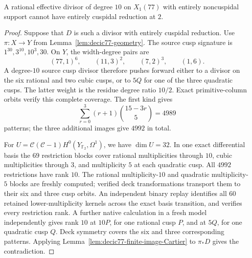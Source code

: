 \begin{lemma}\label{lem:decic77-pure-cusps}
A rational effective divisor of degree $10$ on $X_1(77)$ with
entirely noncuspidal support cannot have entirely cuspidal
reduction at $2$.
\end{lemma}
\begin{proof}
Suppose that $D$ is such a divisor with entirely cuspidal reduction.
Use $\pi:X\to Y$ from Lemma~\ref{lem:decic77-geometry}.
The source cusp signature is $1^{30},3^{10},10^3,30$.
On $Y$, the width-degree pairs are
\[
 (77,1)^6,\qquad(11,3)^2,\qquad(7,2)^3,\qquad(1,6).
\]
A degree-$10$ source cusp divisor therefore pushes forward
either to a divisor on the six rational and two cubic cusps,
or to $5Q$ for one of the three quadratic cusps.
The latter weight is the residue degree ratio $10/2$.
Exact primitive-column orbits verify this complete coverage.
The first kind gives
\[
 \sum_{r=0}^3(r+1)\binom{15-3r}{5}=4989
\]
patterns; the three additional images give $4992$ in total.

For $U=\mathcal C(\mathcal C-1)H^0(Y_{\mathbb F_2},\Omega^1)$,
we have $\dim U=32$.
In one exact differential basis the $69$ restriction blocks
cover rational multiplicities through $10$, cubic multiplicities
through $3$, and multiplicity $5$ at each quadratic cusp.
All $4992$ restrictions have rank $10$.
The rational multiplicity-$10$ and quadratic multiplicity-$5$
blocks are freshly computed; verified deck transformations
transport them to their six and three cusp orbits.
An independent binary replay identifies all $60$ retained
lower-multiplicity kernels across the exact basis transition,
and verifies every restriction rank.
A further native calculation in a fresh model independently
gives rank $10$ at $10P$, for one rational cusp $P$, and at
$5Q$, for one quadratic cusp $Q$.
Deck symmetry covers the six and three corresponding patterns.
Applying Lemma~\ref{lem:decic77-finite-image-Cartier} to
$\pi_*D$ gives the contradiction.
\end{proof}
